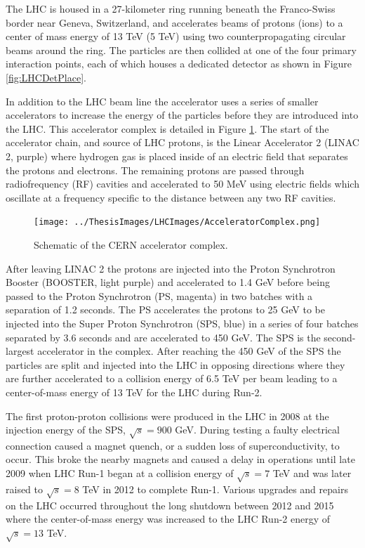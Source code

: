 The LHC is housed in a 27-kilometer ring running beneath the Franco-Swiss border near Geneva, Switzerland, and accelerates beams of protons (ions) to a center of mass energy of 13 TeV (5 TeV) using two counterpropagating circular beams around the ring.  The particles are then collided at one of the four primary interaction points, each of which houses a dedicated detector as shown in Figure \ref{fig:LHCDetPlace}. 

In addition to the LHC beam line the accelerator uses a series of smaller accelerators to increase the energy of the particles before they are introduced into the LHC.  This accelerator complex is detailed in Figure \ref{fig:AcceleratorMap}.  The start of the accelerator chain, and source of LHC protons, is the Linear Accelerator 2 (LINAC 2, purple) where hydrogen gas is placed inside of an electric field that separates the protons and electrons.  The remaining protons are passed through radiofrequency (RF) cavities and accelerated to 50 MeV using electric fields which oscillate at a frequency specific to the distance between any two RF cavities.
\begin{figure}[ht!]
	\centering
	\texttt{[image: ../ThesisImages/LHCImages/AcceleratorComplex.png]}
	\caption[Schematic of the CERN accelerator complex.]{Schematic of the CERN accelerator complex\cite{LHCAccComplex}.
	}
	\label{fig:AcceleratorMap}
\end{figure}

After leaving LINAC 2 the protons are injected into the Proton Synchrotron Booster (BOOSTER, light purple) and accelerated to 1.4 GeV before being passed to the Proton Synchrotron (PS, magenta) in two batches with a separation of 1.2 seconds.  The PS accelerates the protons to 25 GeV to be injected into the Super Proton Synchrotron (SPS, blue) in a series of four batches separated by 3.6 seconds and are accelerated to 450 GeV.  The SPS is the second-largest accelerator in the complex.  After reaching the 450 GeV of the SPS the particles are split and injected into the LHC in opposing directions where they are further accelerated to a collision energy of 6.5 TeV per beam leading to a center-of-mass energy of 13 TeV for the LHC during Run-2.

The first proton-proton collisions were produced in the LHC in 2008 at the injection energy of the SPS, $\sqrt{s} =900$ GeV.  During testing a faulty electrical connection caused a magnet quench, or a sudden loss of superconductivity, to occur.  This broke the nearby magnets and caused a delay in operations until late 2009 when LHC Run-1 began at a collision energy of $\sqrt{s} = 7$ TeV and was later raised to $\sqrt{s}=8$ TeV in 2012 to complete Run-1.  Various upgrades and repairs on the LHC occurred throughout the long shutdown between 2012 and 2015 where the center-of-mass energy was increased to the LHC Run-2 energy of $\sqrt{s} = 13$ TeV.

